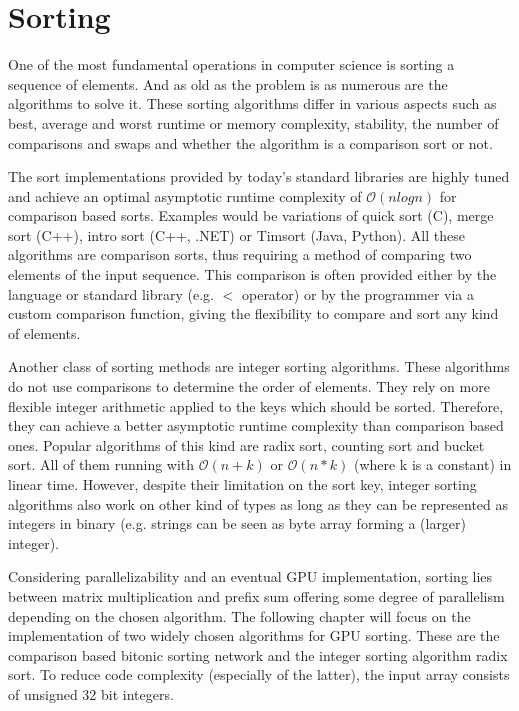 \chapter{Sorting}
\label{sec:sorting}

One of the most fundamental operations in computer science is sorting a sequence of elements. And as old as the problem is as numerous are the algorithms to solve it. These sorting algorithms differ in various aspects such as best, average and worst runtime or memory complexity, stability, the number of comparisons and swaps and whether the algorithm is a comparison sort or not.

The sort implementations provided by today's standard libraries are highly tuned and achieve an optimal asymptotic runtime complexity of $\mathcal{O}(n log n)$ for comparison based sorts. Examples would be variations of quick sort (C), merge sort (C++), intro sort (C++, .NET) or Timsort (Java, Python). All these algorithms are comparison sorts, thus requiring a method of comparing two elements of the input sequence. This comparison is often provided either by the language or standard library (e.g. $<$ operator) or by the programmer via a custom comparison function, giving the flexibility to compare and sort any kind of elements.

Another class of sorting methods are integer sorting algorithms. These algorithms do not use comparisons to determine the order of elements. They rely on more flexible integer arithmetic applied to the keys which should be sorted. Therefore, they can achieve a better asymptotic runtime complexity than comparison based ones. Popular algorithms of this kind are radix sort, counting sort and bucket sort. All of them running with $\mathcal{O}(n + k)$ or $\mathcal{O}(n * k)$ (where k is a constant) in linear time.
However, despite their limitation on the sort key, integer sorting algorithms also work on other kind of types as long as they can be represented as integers in binary (e.g. strings can be seen as byte array forming a (larger) integer).

Considering parallelizability and an eventual GPU implementation, sorting lies between matrix multiplication and prefix sum offering some degree of parallelism depending on the chosen algorithm. The following chapter will focus on the implementation of two widely chosen algorithms for GPU sorting. These are the comparison based bitonic sorting network and the integer sorting algorithm radix sort. To reduce code complexity (especially of the latter), the input array consists of unsigned 32 bit integers.


